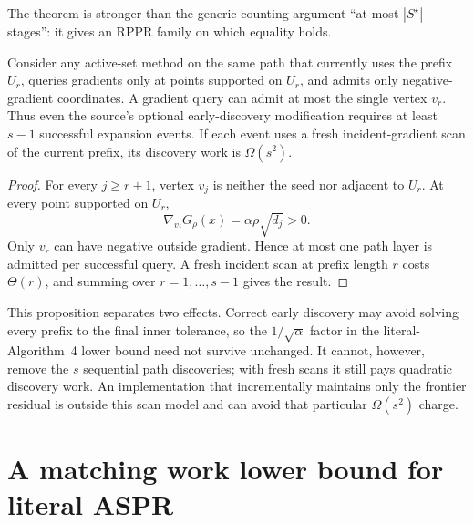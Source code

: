 \documentclass[11pt]{article}
\begin{document}
The theorem is stronger than the generic counting argument ``at most
$|S^\star|$ stages'': it gives an RPPR family on which equality holds.

\begin{proposition}
\label{prop:early-path-layers}
Consider any active-set method on the same path that currently uses the prefix
$U_r$, queries gradients only at points supported on $U_r$, and admits only
negative-gradient coordinates.  A gradient query can admit at most the single
vertex $v_r$.  Thus even the source's optional early-discovery modification
requires at least $s-1$ successful expansion events.  If each event uses a
fresh incident-gradient scan of the current prefix, its discovery work is
$\Omega(s^2)$.
\end{proposition}

\begin{proof}
For every $j\geq r+1$, vertex $v_j$ is neither the seed nor adjacent to
$U_r$.  At every point supported on $U_r$,
\[
 \nabla_{v_j}G_\rho(x)=\alpha\rho\sqrt{d_j}>0.
\]
Only $v_r$ can have negative outside gradient.  Hence at most one path layer
is admitted per successful query.  A fresh incident scan at prefix length
$r$ costs $\Theta(r)$, and summing over $r=1,\ldots,s-1$ gives the result.
\end{proof}

This proposition separates two effects.  Correct early discovery may avoid
solving every prefix to the final inner tolerance, so the
$1/\sqrt\alpha$ factor in the literal-Algorithm~4 lower bound need not survive
unchanged.  It cannot, however, remove the $s$ sequential path discoveries;
with fresh scans it still pays quadratic discovery work.  An implementation
that incrementally maintains only the frontier residual is outside this scan
model and can avoid that particular $\Omega(s^2)$ charge.

\section{A matching work lower bound for literal ASPR}
\label{sec:work-lower-bound}
\end{document}
